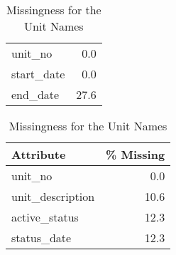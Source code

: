 \begin{table}
\begin{minipage}[t]{0.48\textwidth}
\begin{tabular}{lr}
   unit\_no &        0.0 \\
start\_date &        0.0 \\
  end\_date &       27.6 \\
\bottomrule
\end{tabular}
\vspace{2\baselineskip}
		\caption{Missingness for the Unit Names}
\begin{tabular}{lr}
\toprule
       Attribute &  \% Missing \\
\midrule
         unit\_no &        0.0 \\
unit\_description &       10.6 \\
   active\_status &       12.3 \\
     status\_date &       12.3 \\
\bottomrule
\end{tabular}
\end{minipage}
\end{table}
